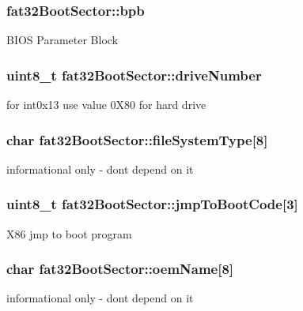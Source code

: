 \subsubsection[{bpb}]{ fat32\+Boot\+Sector\+::bpb}\label{structfat32_boot_sector_a01848fd44bea48d521bf13dcc8d69c95}
B\+I\+O\+S Parameter Block \hypertarget{structfat32_boot_sector_a625a50384e3a46c5e330d0398c35a898}{}
\subsubsection[{drive\+Number}]{\setlength{\rightskip}{0pt plus 5cm}uint8\+\_\+t fat32\+Boot\+Sector\+::drive\+Number}\label{structfat32_boot_sector_a625a50384e3a46c5e330d0398c35a898}
for int0x13 use value 0\+X80 for hard drive \hypertarget{structfat32_boot_sector_a2835c957e6b680afded2b5f7e133fd3e}{}
\subsubsection[{file\+System\+Type}]{\setlength{\rightskip}{0pt plus 5cm}char fat32\+Boot\+Sector\+::file\+System\+Type\mbox{[}8\mbox{]}}\label{structfat32_boot_sector_a2835c957e6b680afded2b5f7e133fd3e}
informational only -\/ don\textquotesingle{}t depend on it \hypertarget{structfat32_boot_sector_ad8c4921d1fcaba0370cff44a27f6f2d1}{}
\subsubsection[{jmp\+To\+Boot\+Code}]{\setlength{\rightskip}{0pt plus 5cm}uint8\+\_\+t fat32\+Boot\+Sector\+::jmp\+To\+Boot\+Code\mbox{[}3\mbox{]}}\label{structfat32_boot_sector_ad8c4921d1fcaba0370cff44a27f6f2d1}
X86 jmp to boot program \hypertarget{structfat32_boot_sector_a8516a46b7865715cf0f8f5c39dd96273}{}
\subsubsection[{oem\+Name}]{\setlength{\rightskip}{0pt plus 5cm}char fat32\+Boot\+Sector\+::oem\+Name\mbox{[}8\mbox{]}}\label{structfat32_boot_sector_a8516a46b7865715cf0f8f5c39dd96273}
informational only -\/ don\textquotesingle{}t depend on it \hypertarget{structfat32_boot_sector_a0a59c59a3f18c1117ffc6a0c25295b9c}{}

